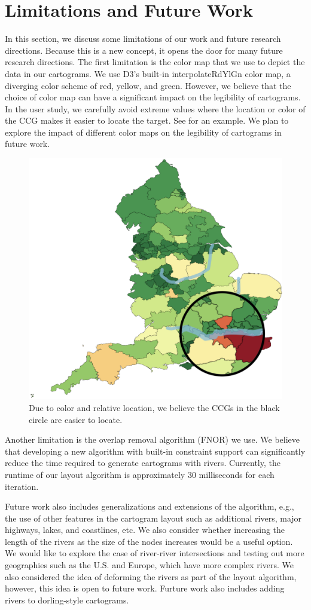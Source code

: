 \section{Limitations and Future Work}
\label{sec:{Limitations and Future Work}}

In this section, we discuss some limitations of our work and future research directions.
Because this is a new concept, it opens the door for many future research directions.
The first limitation is the color map that we use to depict the data in our cartograms. 
We use D3's built-in interpolateRdYlGn color map, a diverging color scheme of red, yellow, and green.
However, we believe that the choice of color map can have a significant impact on the legibility of cartograms.
In the user study, we carefully avoid extreme values where the location or color of the CCG makes it easier to locate the target.
See  for an example.
We plan to explore the impact of different color maps on the legibility of cartograms in future work.

{
    \begin{figure}[tb!]
        \centering
        \includegraphics[width=0.7\columnwidth,keepaspectratio]{figure/limitations/extreme.png}
        \caption{Due to color and relative location, we believe the CCGs in the black circle are easier to locate.}
        \label{fig:extreme}
    \end{figure}
}

Another limitation is the overlap removal algorithm (FNOR) we use.
We believe that developing a new algorithm with built-in constraint support can significantly reduce the time required to generate cartograms with rivers. Currently, the runtime of our layout algorithm is approximately 30 milliseconds for each iteration.

Future work also includes generalizations and extensions of the algorithm, e.g., the use of other features in the cartogram layout such as additional rivers, major highways, lakes, and coastlines, etc.
We also consider whether increasing the length of the rivers as the size of the nodes increases would be a useful option.
We would like to explore the case of river-river intersections and testing out more geographies such as the U.S. and Europe, which have more complex rivers.
We also considered the idea of deforming the rivers as part of the layout algorithm, however, this idea is open to future work.
Furture work also includes adding rivers to dorling-style cartograms.
